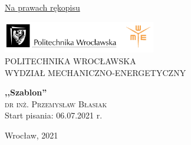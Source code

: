\documentclass[a4paper,11pt]{report}
\begin{document}
\begin{titlepage}
\begin{flushright}
\underline{Na prawach rękopisu}
\end{flushright}
 \vspace{0.5cm}
\begin{center}

\includegraphics[width=0.5\textwidth]{figures/logo.png}\\
{\large{POLITECHNIKA WROCŁAWSKA}}\\
{\large{WYDZIAŁ MECHANICZNO-ENERGETYCZNY}}
 \vspace{5cm}

 {\LARGE\bfseries ,,Szablon''\\}
 \vspace{1.5cm}
 {\Large \textsc{dr inż. Przemysław Błasiak}}\\[5pt]
 
 \vspace{1.0cm}
%
%
%
{\Large{Start pisania: 06.07.2021 r.}}\\[5pt]
\vspace{6.0cm}

{Wrocław, 2021}
\end{center}
\end{titlepage}

\tableofcontents






\lstlistoflistings
\end{document}
